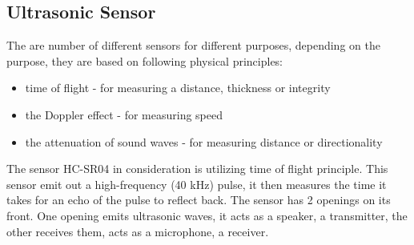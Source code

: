 \subsection{Ultrasonic Sensor}\label{sub:ultrasonic}
The are number of different sensors for different purposes, depending on the purpose, they are based on following physical principles:
\begin{itemize}
  \item time of flight - for measuring a distance, thickness or integrity\cite{ultrasound2}
  \item the Doppler effect - for measuring speed\cite{ultrasound}
  \item the attenuation of sound waves - for measuring distance or directionality\cite{ultrasound}
\end{itemize}
The sensor HC-SR04 in consideration is utilizing time of flight principle. This sensor emit out a high-frequency (40 kHz) pulse, it then measures the time it takes for an echo of the pulse to reflect back. The sensor has 2 openings on its front. One opening emits ultrasonic waves, it acts as a speaker, a transmitter, the other receives them, acts as a microphone, a receiver.

